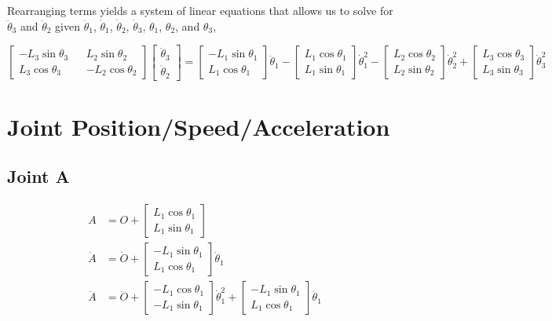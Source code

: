 \documentclass[letterpaper]{article}
\begin{document}
\noindent Rearranging terms yields a system of linear equations that allows us to solve for $\ddot{\theta}_3$ and $\ddot{\theta}_2$ given $\ddot{\theta}_1$, $\dot{\theta}_1$, $\dot{\theta}_2$, $\dot{\theta}_3$, $\theta_1$, $\theta_2$, and $\theta_3$,

\begin{equation}
	\begin{bmatrix} -L_3 \sin \theta_3 && L_2 \sin \theta_2 \\ L_3 \cos \theta_3 && -L_2 \cos \theta_2 \end{bmatrix} \begin{bmatrix} \ddot{\theta}_3 \\ \ddot{\theta}_2 \end{bmatrix} = \begin{bmatrix} -L_1 \sin \theta_1 \\ L_1 \cos \theta_1 \end{bmatrix} \ddot{\theta}_1 - \begin{bmatrix} L_1 \cos \theta_1 \\ L_1 \sin \theta_1 \end{bmatrix} \dot{\theta}_1^2 - \begin{bmatrix} L_2 \cos \theta_2 \\ L_2 \sin \theta_2 \end{bmatrix} \dot{\theta}_2^2 + \begin{bmatrix} L_3 \cos \theta_3 \\ L_3 \sin \theta_3 \end{bmatrix} \dot{\theta}_3^2
\end{equation}

\section{Joint Position/Speed/Acceleration}
\subsection{Joint A}

\begin{align}
	A &= O + \begin{bmatrix} L_1 \cos \theta_1 \\ L_1 \sin \theta_1 \end{bmatrix} \\
	\dot{A} &= \dot{O} + \begin{bmatrix} -L_1 \sin \theta_1 \\ L_1 \cos \theta_1 \end{bmatrix} \dot{\theta}_1 \\
	\ddot{A} &= \ddot{O} + \begin{bmatrix} -L_1 \cos \theta_1 \\ -L_1 \sin \theta_1 \end{bmatrix} \dot{\theta}_1^2 + \begin{bmatrix} -L_1 \sin \theta_1 \\ L_1 \cos \theta_1 \end{bmatrix} \ddot{\theta}_1
\end{align}
\end{document}
